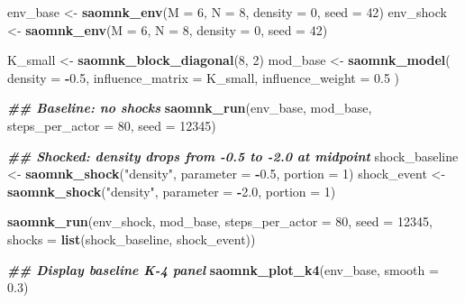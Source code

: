 \documentclass[
]{article}
\newenvironment{Shaded}{\begin{snugshade}}{\end{snugshade}}
\newcommand{\AttributeTok}[1]{\textcolor[rgb]{0.13,0.29,0.53}{#1}}
\newcommand{\DecValTok}[1]{\textcolor[rgb]{0.00,0.00,0.81}{#1}}
\newcommand{\DocumentationTok}[1]{\textcolor[rgb]{0.56,0.35,0.01}{\textbf{\textit{#1}}}}
\newcommand{\FloatTok}[1]{\textcolor[rgb]{0.00,0.00,0.81}{#1}}
\newcommand{\FunctionTok}[1]{\textcolor[rgb]{0.13,0.29,0.53}{\textbf{#1}}}
\newcommand{\NormalTok}[1]{#1}
\newcommand{\OtherTok}[1]{\textcolor[rgb]{0.56,0.35,0.01}{#1}}
\newcommand{\SpecialCharTok}[1]{\textcolor[rgb]{0.81,0.36,0.00}{\textbf{#1}}}
\newcommand{\StringTok}[1]{\textcolor[rgb]{0.31,0.60,0.02}{#1}}
\begin{document}
\begin{Shaded}
\begin{Highlighting}[]
\NormalTok{env\_base }\OtherTok{\textless{}{-}} \FunctionTok{saomnk\_env}\NormalTok{(}\AttributeTok{M =} \DecValTok{6}\NormalTok{, }\AttributeTok{N =} \DecValTok{8}\NormalTok{, }\AttributeTok{density =} \DecValTok{0}\NormalTok{, }\AttributeTok{seed =} \DecValTok{42}\NormalTok{)}
\NormalTok{env\_shock }\OtherTok{\textless{}{-}} \FunctionTok{saomnk\_env}\NormalTok{(}\AttributeTok{M =} \DecValTok{6}\NormalTok{, }\AttributeTok{N =} \DecValTok{8}\NormalTok{, }\AttributeTok{density =} \DecValTok{0}\NormalTok{, }\AttributeTok{seed =} \DecValTok{42}\NormalTok{)}

\NormalTok{K\_small }\OtherTok{\textless{}{-}} \FunctionTok{saomnk\_block\_diagonal}\NormalTok{(}\DecValTok{8}\NormalTok{, }\DecValTok{2}\NormalTok{)}
\NormalTok{mod\_base }\OtherTok{\textless{}{-}} \FunctionTok{saomnk\_model}\NormalTok{(}
  \AttributeTok{density =} \SpecialCharTok{{-}}\FloatTok{0.5}\NormalTok{,}
  \AttributeTok{influence\_matrix =}\NormalTok{ K\_small,}
  \AttributeTok{influence\_weight =} \FloatTok{0.5}
\NormalTok{)}

\DocumentationTok{\#\# Baseline: no shocks}
\FunctionTok{saomnk\_run}\NormalTok{(env\_base, mod\_base, }\AttributeTok{steps\_per\_actor =} \DecValTok{80}\NormalTok{, }\AttributeTok{seed =} \DecValTok{12345}\NormalTok{)}

\DocumentationTok{\#\# Shocked: density drops from {-}0.5 to {-}2.0 at midpoint}
\NormalTok{shock\_baseline }\OtherTok{\textless{}{-}} \FunctionTok{saomnk\_shock}\NormalTok{(}\StringTok{"density"}\NormalTok{, }\AttributeTok{parameter =} \SpecialCharTok{{-}}\FloatTok{0.5}\NormalTok{, }\AttributeTok{portion =} \DecValTok{1}\NormalTok{)}
\NormalTok{shock\_event    }\OtherTok{\textless{}{-}} \FunctionTok{saomnk\_shock}\NormalTok{(}\StringTok{"density"}\NormalTok{, }\AttributeTok{parameter =} \SpecialCharTok{{-}}\FloatTok{2.0}\NormalTok{, }\AttributeTok{portion =} \DecValTok{1}\NormalTok{)}

\FunctionTok{saomnk\_run}\NormalTok{(env\_shock, mod\_base, }\AttributeTok{steps\_per\_actor =} \DecValTok{80}\NormalTok{, }\AttributeTok{seed =} \DecValTok{12345}\NormalTok{,}
           \AttributeTok{shocks =} \FunctionTok{list}\NormalTok{(shock\_baseline, shock\_event))}
\end{Highlighting}
\end{Shaded}

\begin{Shaded}
\begin{Highlighting}[]
\DocumentationTok{\#\# Display baseline K{-}4 panel}
\FunctionTok{saomnk\_plot\_k4}\NormalTok{(env\_base, }\AttributeTok{smooth =} \FloatTok{0.3}\NormalTok{)}
\end{Highlighting}
\end{Shaded}
\end{document}
